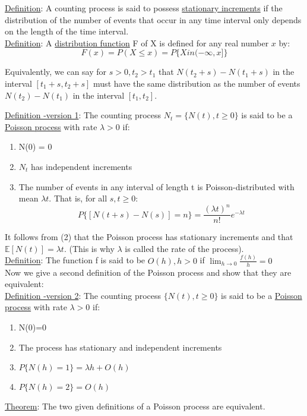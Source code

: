 \documentclass[11pt]{book}
\begin{document}
\underline{Definition}: A counting process is said to possess \underline{stationary increments} if the distribution of the number of events that occur in any time interval only depends on the length of the time interval.\\

\underline{Definition}: A \underline{distribution function} F of X is defined for any real number $x$ by: $$F(x) = P(X \leq x) = P\{ X in (-\infty,x] \}$$

Equivalently, we can say for $s>0, t_{2}>t_{1}$ that $N(t_{2} + s) - N(t_{1} + s)$ in the interval $[t_{1} + s,t_{2} + s]$ must have the same distribution as the number of events $N(t_{2}) - N(t_{1})$ in the interval $[t_{1},t_{2}]$.

\underline{Definition -version 1}: The counting process $N_{t} = \{N(t), t \geq 0 \}$ is said to be a \underline{Poisson process} with rate $\lambda > 0 $ if: \begin{enumerate}
\item N(0) = 0
\item $N_{t}$ has independent increments
\item The number of events in any interval of length t is Poisson-distributed with mean $\lambda t$. That is, for all $s,t \geq 0$: $$P\{[N(t+s) - N(s)] = n \} = \frac{(\lambda t)^{n}}{n!}e^{-\lambda t}$$
\end{enumerate}
It follows from (2) that the Poisson process has stationary increments and that $\mathbb{E}[N(t)] = \lambda t$. (This is why $\lambda$ is called the rate of the process).\\

\underline{Definition}: The function f is said to be $O(h), h>0$ if $\lim_{h\rightarrow 0 } \frac{f(h)}{h} = 0$\\

Now we give a second definition of the Poisson process and show that they are equivalent:\\

\underline{Definition -version 2}: The counting process $\{N(t), t\geq 0\}$ is said to be a \underline{Poisson process} with rate $\lambda > 0$ if: \begin{enumerate}
\item N(0)=0
\item The process has stationary and independent increments
\item $P\{N(h) = 1 \} = \lambda h + O(h)$
\item $P\{N(h) = 2 \} = O(h)$
\end{enumerate}
\underline{Theorem}: The two given definitions of a Poisson process are equivalent.\\
\end{document}
